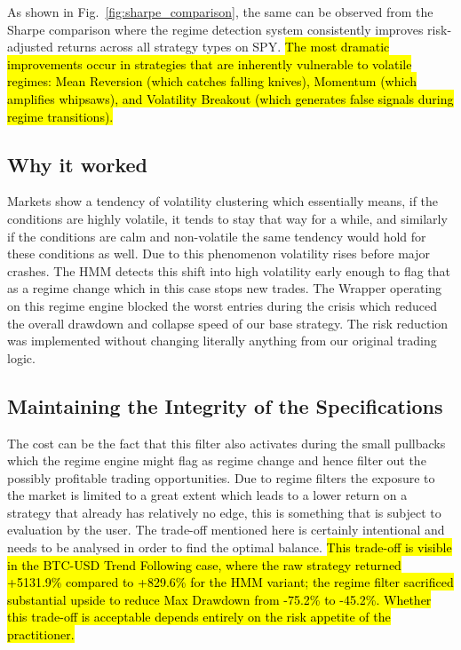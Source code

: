 \documentclass[conference]{IEEEtran}
\begin{document}
As shown in Fig.~\ref{fig:sharpe_comparison}, the same can be observed from the Sharpe comparison where the regime detection system consistently improves risk-adjusted returns across all strategy types on SPY. \hl{The most dramatic improvements occur in strategies that are inherently vulnerable to volatile regimes: Mean Reversion (which catches falling knives), Momentum (which amplifies whipsaws), and Volatility Breakout (which generates false signals during regime transitions).}

\subsection{Why it worked}

Markets show a tendency of volatility clustering which essentially means, if the conditions are highly volatile, it tends to stay that way for a while, and similarly if the conditions are calm and non-volatile the same tendency would hold for these conditions as well. Due to this phenomenon volatility rises before major crashes. The HMM detects this shift into high volatility early enough to flag that as a regime change which in this case stops new trades. The Wrapper operating on this regime engine blocked the worst entries during the crisis which reduced the overall drawdown and collapse speed of our base strategy. The risk reduction was implemented without changing literally anything from our original trading logic.

\subsection{Maintaining the Integrity of the Specifications}

The cost can be the fact that this filter also activates during the small pullbacks which the regime engine might flag as regime change and hence filter out the possibly profitable trading opportunities. Due to regime filters the exposure to the market is limited to a great extent which leads to a lower return on a strategy that already has relatively no edge, this is something that is subject to evaluation by the user. The trade-off mentioned here is certainly intentional and needs to be analysed in order to find the optimal balance. \hl{This trade-off is visible in the BTC-USD Trend Following case, where the raw strategy returned +5131.9\% compared to +829.6\% for the HMM variant; the regime filter sacrificed substantial upside to reduce Max Drawdown from -75.2\% to -45.2\%. Whether this trade-off is acceptable depends entirely on the risk appetite of the practitioner.}
\end{document}
